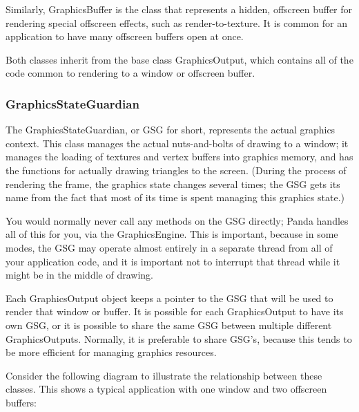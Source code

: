 \documentclass[a4paper]{article}
\begin{document}
{\color{black}
Similarly, GraphicsBuffer is the class that represents a hidden, offscreen buffer for rendering special offscreen
effects, such as render-to-texture. It is common for an application to have many offscreen buffers open at once. }

{\color{black}
Both classes inherit from the base class GraphicsOutput, which contains all of the code common to rendering to a window
or offscreen buffer. }

\clearpage\subsubsection[GraphicsStateGuardian]{GraphicsStateGuardian}
\hypertarget{RefHeading4100869075401}{}{\color{black}
The GraphicsStateGuardian, or GSG for short, represents the actual graphics context. This class manages the actual
nuts-and-bolts of drawing to a window; it manages the loading of textures and vertex buffers into graphics memory, and
has the functions for actually drawing triangles to the screen. (During the process of rendering the frame, the
{\textquotedbl}graphics state{\textquotedbl} changes several times; the GSG gets its name from the fact that most of
its time is spent managing this graphics state.) }

{\color{black}
You would normally never call any methods on the GSG directly; Panda handles all of this for you, via the
GraphicsEngine. This is important, because in some modes, the GSG may operate almost entirely in a separate thread from
all of your application code, and it is important not to interrupt that thread while it might be in the middle of
drawing. }

{\color{black}
Each GraphicsOutput object keeps a pointer to the GSG that will be used to render that window or buffer. It is possible
for each GraphicsOutput to have its own GSG, or it is possible to share the same GSG between multiple different
GraphicsOutputs. Normally, it is preferable to share GSG's, because this tends to be more efficient for managing
graphics resources. }

{\color{black}
Consider the following diagram to illustrate the relationship between these classes. This shows a typical application
with one window and two offscreen buffers: }
\end{document}
